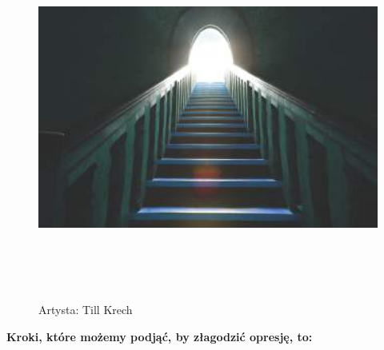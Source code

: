 \begin{figure}[h]
	\centering
	\includegraphics[height=12cm]{TeX_files/4-1.png}
	\caption{Artysta: Till Krech}
	\label{2-0}
\end{figure}

\noindent\textcolor{ProcessBlue}{\textbf{\LARGE	{Kroki, które możemy podjąć, by złagodzić opresję, to:}}}\\

